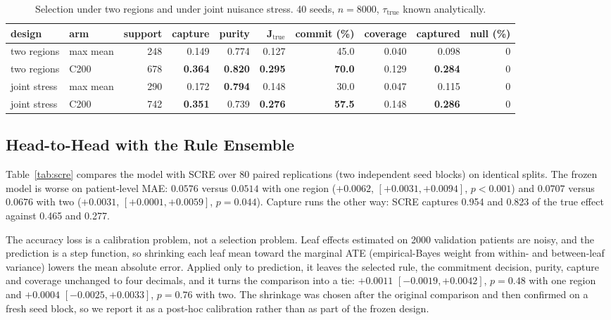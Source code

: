 \documentclass[conference]{IEEEtran}
\begin{document}
\begin{table}[t]
\caption{Selection under two regions and under joint nuisance stress. 40 seeds,
$n=8000$, $\tau_{\text{true}}$ known analytically.}
\label{tab:tworeg}
\centering
\footnotesize
\setlength{\tabcolsep}{4pt}
\begin{tabular}{@{}llrrrrrrrr@{}}
\toprule
design & arm & support & capture & purity & J$_{\text{true}}$ & commit
(\%) & coverage & captured & null (\%)\\
\midrule
two regions & max mean      & 248 & 0.149 & 0.774 & 0.127 & 45.0 & 0.040 & 0.098 & 0\\
two regions & C200          & 678 & \textbf{0.364} & \textbf{0.820} & \textbf{0.295} & \textbf{70.0} & 0.129 & \textbf{0.284} & 0\\
\midrule
joint stress & max mean     & 290 & 0.172 & \textbf{0.794} & 0.148 & 30.0 & 0.047 & 0.115 & 0\\
joint stress & C200         & 742 & \textbf{0.351} & 0.739 & \textbf{0.276} & \textbf{57.5} & 0.148 & \textbf{0.286} & 0\\
\bottomrule
\end{tabular}
\end{table}

\subsection{Head-to-Head with the Rule Ensemble}

Table~\ref{tab:scre} compares the model with SCRE over 80 paired replications
(two independent seed blocks) on identical splits. The frozen model is worse on
patient-level MAE: $0.0576$ versus $0.0514$ with one region
($+0.0062$, $[+0.0031,+0.0094]$, $p<0.001$) and $0.0707$ versus $0.0676$ with
two ($+0.0031$, $[+0.0001,+0.0059]$, $p=0.044$). Capture runs the other way:
SCRE captures 0.954 and 0.823 of the true effect against 0.465 and 0.277.

The accuracy loss is a calibration problem, not a selection problem. Leaf
effects estimated on 2000 validation patients are noisy, and the prediction is
a step function, so shrinking each leaf mean toward the marginal ATE
(empirical-Bayes weight from within- and between-leaf variance) lowers the mean
absolute error. Applied only to prediction, it leaves the selected rule, the
commitment decision, purity, capture and coverage unchanged to four decimals,
and it turns the comparison into a tie: $+0.0011$
$[-0.0019,+0.0042]$, $p=0.48$ with one region and $+0.0004$
$[-0.0025,+0.0033]$, $p=0.76$ with two. The shrinkage was chosen after the
original comparison and then confirmed on a fresh seed block, so we report it as
a post-hoc calibration rather than as part of the frozen design.
\end{document}
